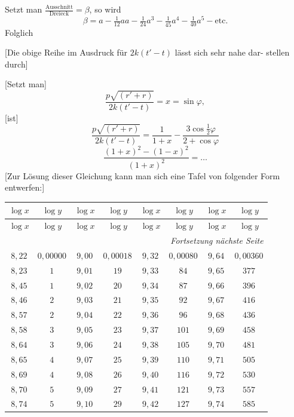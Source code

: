 \documentclass[12pt,a4paper]{article}
\begin{document}
Setzt man $\frac{\text{Ausschnitt}}{\text{Dreieck}} = \beta$, so wird
\[
\beta = a - \tfrac{1}{12}aa - \tfrac{1}{24}a^3 - \tfrac{1}{45}a^4 - \tfrac{1}{40}a^5 - \text{etc.}
\]
Folglich

[Die obige Reihe im Ausdruck f\"ur $2k(t' - t)$ l\"asst sich sehr nahe dar-
stellen durch]

[Setzt man]
\[
\frac{p\sqrt{(r' + r)}}{2k(t' - t)} = x = \sin\varphi,
\]
[ist]
\[
\frac{p\sqrt{(r' + r)}}{2k(t' - t)} = \frac{1}{1 + x} - \frac{3\cos\tfrac{1}{2}\varphi}{2 + \cos\varphi}
\]
\[
\frac{(1 + x)^2 - (1 - x)^2}{(1 + x)^2} = \ldots
\]
[Zur L\"osung dieser Gleichung kann man sich eine Tafel von folgender
Form entwerfen:]

\newpage

\begin{center}
\begin{longtable}{|c|c|c|c|c|c|c|c|}
\hline
$\log x$ & $\log y$ & $\log x$ & $\log y$ & $\log x$ & $\log y$ & $\log x$ & $\log y$ \\
\hline
\endfirsthead
\hline
$\log x$ & $\log y$ & $\log x$ & $\log y$ & $\log x$ & $\log y$ & $\log x$ & $\log y$ \\
\hline
\endhead
\multicolumn{8}{r}{\textit{Fortsetzung n\"achste Seite}} \\
\endfoot
\hline
\endlastfoot
$8{,}22$ & $0{,}00000$ & $9{,}00$ & $0{,}00018$ & $9{,}32$ & $0{,}00080$ & $9{,}64$ & $0{,}00360$ \\
$8{,}23$ & $1$ & $9{,}01$ & $19$ & $9{,}33$ & $84$ & $9{,}65$ & $377$ \\
$8{,}45$ & $1$ & $9{,}02$ & $20$ & $9{,}34$ & $87$ & $9{,}66$ & $396$ \\
$8{,}46$ & $2$ & $9{,}03$ & $21$ & $9{,}35$ & $92$ & $9{,}67$ & $416$ \\
$8{,}57$ & $2$ & $9{,}04$ & $22$ & $9{,}36$ & $96$ & $9{,}68$ & $436$ \\
$8{,}58$ & $3$ & $9{,}05$ & $23$ & $9{,}37$ & $101$ & $9{,}69$ & $458$ \\
$8{,}64$ & $3$ & $9{,}06$ & $24$ & $9{,}38$ & $105$ & $9{,}70$ & $481$ \\
$8{,}65$ & $4$ & $9{,}07$ & $25$ & $9{,}39$ & $110$ & $9{,}71$ & $505$ \\
$8{,}69$ & $4$ & $9{,}08$ & $26$ & $9{,}40$ & $116$ & $9{,}72$ & $530$ \\
$8{,}70$ & $5$ & $9{,}09$ & $27$ & $9{,}41$ & $121$ & $9{,}73$ & $557$ \\
$8{,}74$ & $5$ & $9{,}10$ & $29$ & $9{,}42$ & $127$ & $9{,}74$ & $585$ \\

\end{longtable}
\end{center}
\end{document}
